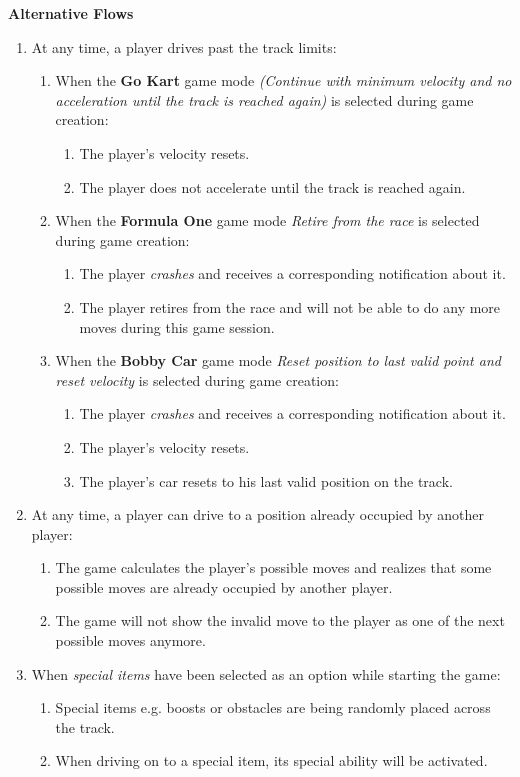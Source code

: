 			\textbf{Alternative Flows}
				\begin{enumerate}
					\item At any time, a player drives past the track limits:
					\begin{enumerate}
						\item When the \textbf{Go Kart} game mode \textit{(Continue with minimum velocity and no acceleration until the track is reached again)} is selected during game creation:
						\begin{enumerate}
							\item The player's velocity resets.
							\item The player does not accelerate until the track is reached again.
						\end{enumerate}
						\item When the \textbf{Formula One} game mode \textit{Retire from the race} is selected during game creation:
						\begin{enumerate}
							\item The player \textit{crashes} and receives a corresponding notification about it.
							\item The player retires from the race and will not be able to do any more moves during this game session.
						\end{enumerate}
						\item When the \textbf{Bobby Car} game mode \textit{Reset position to last valid point and reset velocity} is selected during game creation:
						\begin{enumerate}
							\item The player \textit{crashes} and receives a corresponding notification about it.
							\item The player's velocity resets.
							\item The player's car resets to his last valid position on the track.
						\end{enumerate}
					\end{enumerate}
					\item At any time, a player can drive to a position already occupied by another player:
					\begin{enumerate}
						\item The game calculates the player's possible moves and realizes that some possible moves are already occupied by another player.
						\item The game will not show the invalid move to the player as one of the next possible moves anymore.
					\end{enumerate}
					\item When \textit{special items} have been selected as an option while starting the game:
					\begin{enumerate}
						\item Special items e.g. boosts or obstacles are being randomly placed across the track.
						\item When driving on to a special item, its special ability will be activated.
					\end{enumerate}
				\end{enumerate}

